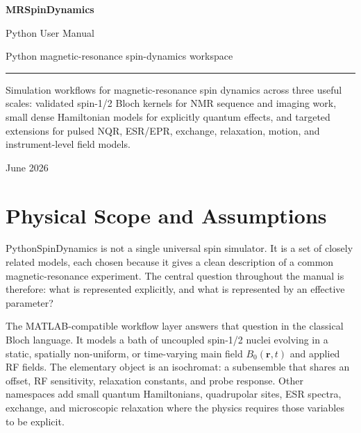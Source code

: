 \documentclass[11pt,oneside]{report}
\begin{document}
\begin{titlepage}
\pagecolor{Soft}
\color{Ink}
\vspace*{0.55in}
\begin{center}
\MRSpinDynamicsLogo[0.85]
\end{center}
\vspace{0.45in}
{\Huge\bfseries MRSpinDynamics\par}
\vspace{0.25in}
{\Large Python User Manual\par}
\vspace{0.15in}
{\large Python magnetic-resonance spin-dynamics workspace\par}
\vspace{0.45in}
{\color{Accent}\rule{0.82\linewidth}{3pt}\par}
\vspace{0.35in}
\begin{minipage}{0.78\linewidth}
\large
Simulation workflows for magnetic-resonance spin dynamics across three useful
scales: validated spin-1/2 Bloch kernels for NMR sequence and imaging work,
small dense Hamiltonian models for explicitly quantum effects, and targeted
extensions for pulsed NQR, ESR/EPR, exchange, relaxation, motion, and
instrument-level field models.
\end{minipage}
\vfill
{\large June 2026\par}
\end{titlepage}
\nopagecolor
\clearpage
{}
\tableofcontents
\clearpage
{}

\chapter{Physical Scope and Assumptions}

PythonSpinDynamics is not a single universal spin simulator. It is a set of
closely related models, each chosen because it gives a clean description of a
common magnetic-resonance experiment. The central question throughout the
manual is therefore: what is represented explicitly, and what is represented by
an effective parameter?

The MATLAB-compatible workflow layer answers that question in the classical
Bloch language. It models a bath of uncoupled spin-1/2 nuclei evolving in a
static, spatially non-uniform, or time-varying main field
\(B_0(\mathbf{r},t)\) and applied RF fields. The elementary object is an
isochromat: a subensemble that shares an offset, RF sensitivity, relaxation
constants, and probe response. Other namespaces add small quantum Hamiltonians,
quadrupolar sites, ESR spectra, exchange, and microscopic relaxation where the
physics requires those variables to be explicit.
\end{document}
